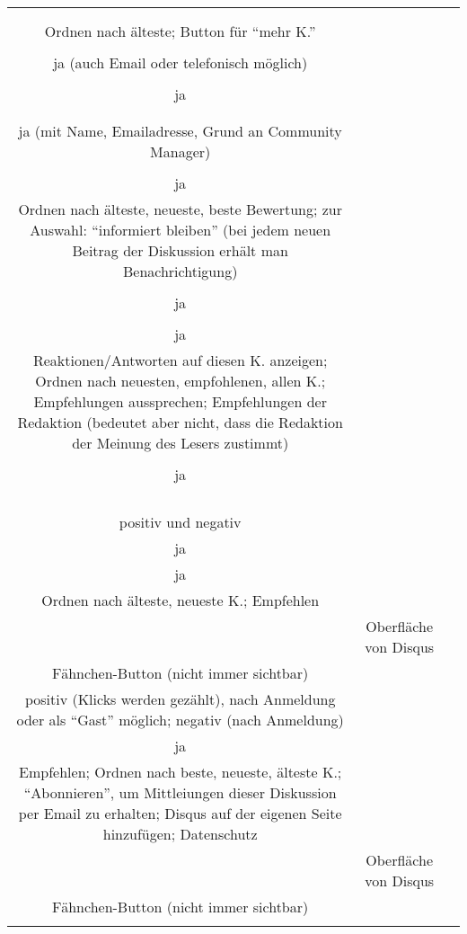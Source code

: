 \begin{landscape}
\begin{tabular}{ccc}
{{		positiv\\
		\\
		Ordnen nach älteste; Button für ``mehr K.''\\
		\\
		ja (auch Email oder telefonisch möglich)\\
		\\
		ja\\
		\\
		&
		\\
		ja (mit Name, Emailadresse, Grund an Community Manager)\\
		\\
		ja\\
		Ordnen nach älteste, neueste, beste Bewertung; zur Auswahl: ``informiert bleiben'' (bei jedem neuen Beitrag der Diskussion erhält man Benachrichtigung)\\
		&
		\\
		ja\\
		\\
		ja\\
		Reaktionen/Antworten auf diesen K. anzeigen; Ordnen nach neuesten, empfohlenen, allen K.; Empfehlungen aussprechen; Empfehlungen der Redaktion (bedeutet aber nicht, dass die Redaktion der Meinung des Lesers zustimmt)\\
		&
		\\
		ja\\
		\\
		\\
		\\
		&%
		\\
		positiv und negativ\\
		ja\\
		ja\\
		Ordnen nach älteste, neueste K.; Empfehlen\\
		&%
		Oberfläche von Disqus\\
		Fähnchen-Button (nicht immer sichtbar)\\
		positiv (Klicks werden gezählt), nach Anmeldung oder als ``Gast'' möglich; negativ (nach Anmeldung)\\
		ja\\
		Empfehlen; Ordnen nach beste, neueste, älteste K.; ``Abonnieren'', um Mittleiungen dieser Diskussion per Email zu erhalten; Disqus auf der eigenen Seite hinzufügen; Datenschutz \\
		&
		Oberfläche von Disqus\\
		Fähnchen-Button (nicht immer sichtbar)\\
}}
\end{tabular}
\end{landscape}
